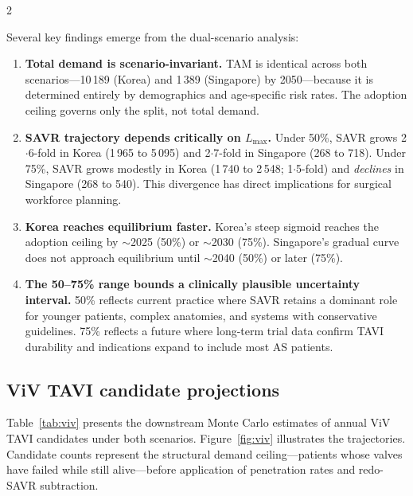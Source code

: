 \documentclass[10pt, a4paper]{article}
\begin{document}
\begin{multicols}{2}

Several key findings emerge from the dual-scenario analysis:

\begin{enumerate}[leftmargin=*, itemsep=4pt]
    \item \textbf{Total demand is scenario-invariant.} TAM is identical across both scenarios---10\,189 (Korea) and 1\,389 (Singapore) by 2050---because it is determined entirely by demographics and age-specific risk rates. The adoption ceiling governs only the split, not total demand.

    \item \textbf{SAVR trajectory depends critically on $L_{\max}$.} Under 50\%, SAVR grows 2$\cdot$6-fold in Korea (1\,965 to 5\,095) and 2$\cdot$7-fold in Singapore (268 to 718). Under 75\%, SAVR grows modestly in Korea (1\,740 to 2\,548; 1$\cdot$5-fold) and \emph{declines} in Singapore (268 to 540). This divergence has direct implications for surgical workforce planning.

    \item \textbf{Korea reaches equilibrium faster.} Korea's steep sigmoid reaches the adoption ceiling by $\sim$2025 (50\%) or $\sim$2030 (75\%). Singapore's gradual curve does not approach equilibrium until $\sim$2040 (50\%) or later (75\%).

    \item \textbf{The 50--75\% range bounds a clinically plausible uncertainty interval.} 50\% reflects current practice where SAVR retains a dominant role for younger patients, complex anatomies, and systems with conservative guidelines. 75\% reflects a future where long-term trial data confirm TAVI durability and indications expand to include most AS patients.
\end{enumerate}

\subsection{ViV TAVI candidate projections}

Table~\ref{tab:viv} presents the downstream Monte Carlo estimates of annual ViV TAVI candidates under both scenarios. Figure~\ref{fig:viv} illustrates the trajectories. Candidate counts represent the structural demand ceiling---patients whose valves have failed while still alive---before application of penetration rates and redo-SAVR subtraction.

\end{multicols}
\end{document}
